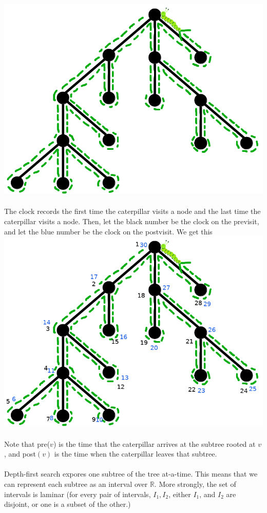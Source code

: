 \documentclass{article}
\newcommand{\R}{\mathbb{R}}
\begin{document}
\includegraphics[scale=0.5]{cattree1}
\ \\
The clock records the first time the caterpillar visits a node and the last time the caterpillar visits a node. Then, let the black number be the clock on the previsit, and let the blue number be the clock on the postvisit. We get this
\includegraphics[scale=0.5]{cattree2}
\ \\
Note that pre($v$) is the time that the caterpillar arrives at the subtree rooted at $v$, and post$(v)$ is the time when the caterpillar leaves that subtree.\\\\
Depth-first search expores one subtree of the tree at-a-time. This means that we can represent each subtree as an interval over $\R$. More strongly, the set of intervals is laminar (for every pair of intervals, $I_1, I_2$, either $I_1$, and $I_2$ are disjoint, or one is a subset of the other.)
\end{document}
